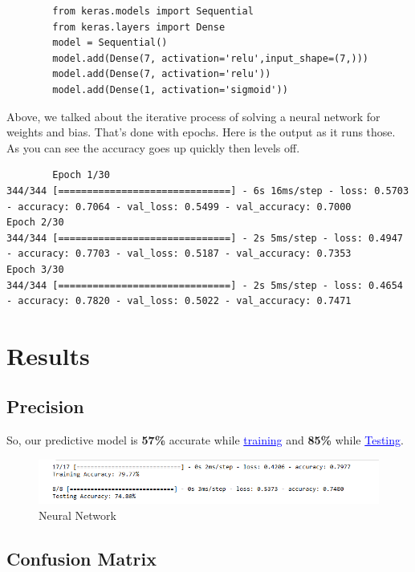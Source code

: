     \begin{lstlisting}
        from keras.models import Sequential
        from keras.layers import Dense
        model = Sequential()
        model.add(Dense(7, activation='relu',input_shape=(7,)))
        model.add(Dense(7, activation='relu'))
        model.add(Dense(1, activation='sigmoid'))   
    \end{lstlisting}
    Above, we talked about the iterative process of solving a neural network for weights and bias.
     That’s done with epochs. Here is the output as it runs those.
     As you can see the accuracy goes up quickly then levels off.
    
     \begin{lstlisting}
        Epoch 1/30
344/344 [==============================] - 6s 16ms/step - loss: 0.5703 - accuracy: 0.7064 - val_loss: 0.5499 - val_accuracy: 0.7000
Epoch 2/30
344/344 [==============================] - 2s 5ms/step - loss: 0.4947 - accuracy: 0.7703 - val_loss: 0.5187 - val_accuracy: 0.7353
Epoch 3/30
344/344 [==============================] - 2s 5ms/step - loss: 0.4654 - accuracy: 0.7820 - val_loss: 0.5022 - val_accuracy: 0.7471    
    \end{lstlisting}
    

\section{Results}
\label{chap:results}

\subsection{Precision}
\label{sec:Precision}

So, our predictive model is \textbf{57\% } accurate while \textcolor{blue}{\underline{training}} and \textbf{85\% } while \textcolor{blue}{\underline {Testing}}.

\begin{figure}[htp]
    \centering
    \includegraphics[width=1.1\textwidth]{images/accuracy.png}
    \caption{Neural Network }
    \label{fig:example4}
\end{figure}

\subsection{Confusion Matrix}
\label{sec:Confusion Matrix}

